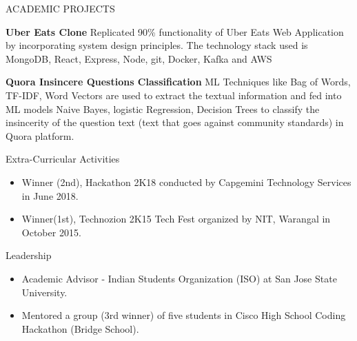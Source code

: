 \documentclass{resume} %
\begin{document}
\vspace{-0.5em}
\begin{rSection}{ACADEMIC PROJECTS}
\vspace{-1.5em}
\item \textbf{Uber Eats Clone}  {Replicated 90\%  functionality of Uber Eats Web Application by  incorporating system design principles. The technology stack used is MongoDB, React, Express, Node, git, Docker, Kafka and AWS }
  \vspace{-0.1em}
\item \textbf{Quora Insincere Questions Classification  }  {ML Techniques like Bag of Words, TF-IDF, Word Vectors are used to extract the textual information and fed into ML models Naive Bayes, logistic Regression, Decision Trees to classify the insincerity of the question text (text that goes against community standards) in Quora platform.  }
  \vspace{-0.2em}
\end{rSection} 

\vspace{-0.5em}
\begin{rSection}{Extra-Curricular Activities} 
\begin{itemize}
\itemsep -6pt {} 
    \item 	Winner (2nd), Hackathon 2K18 conducted by Capgemini Technology Services in June 2018.
    \item	Winner(1st), Technozion 2K15 Tech Fest organized by NIT, Warangal in October 2015.
\end{itemize}
\end{rSection}

\vspace{-0.5em}
\begin{rSection}{Leadership} 
\begin{itemize}
\itemsep -6pt {} 
    \item Academic Advisor - Indian Students Organization (ISO) at San Jose State University.
      \item Mentored a group (3rd winner) of five students in Cisco High School Coding Hackathon (Bridge School).
\end{itemize}


\end{rSection}
\end{document}
